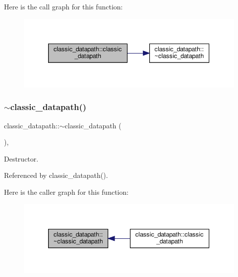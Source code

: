 Here is the call graph for this function\+:
\nopagebreak
\begin{figure}[H]
\begin{center}
\leavevmode
\includegraphics[width=339pt]{d3/d74/classclassic__datapath_a7ea2b03fd17599b8578d7f403642f0aa_cgraph}
\end{center}
\end{figure}
\mbox{\label{classclassic__datapath_a4bf2c606d9fb0d24af66e1589ad5b4e3}} 
\subsubsection{\texorpdfstring{$\sim$classic\+\_\+datapath()}{~classic\_datapath()}}
{\footnotesize\ttfamily classic\+\_\+datapath\+::$\sim$classic\+\_\+datapath (\begin{DoxyParamCaption}{ }\end{DoxyParamCaption})\hspace{0.3cm}{\ttfamily [override]}, {\ttfamily [default]}}



Destructor. 



Referenced by classic\+\_\+datapath().

Here is the caller graph for this function\+:
\nopagebreak
\begin{figure}[H]
\begin{center}
\leavevmode
\includegraphics[width=339pt]{d3/d74/classclassic__datapath_a4bf2c606d9fb0d24af66e1589ad5b4e3_icgraph}
\end{center}
\end{figure}


